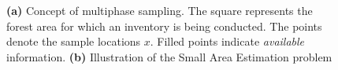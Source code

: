 \documentclass[article]{jss}
\begin{document}
\begin{figure}[htb]
	\begin{subfigure}[t]{0.5\textwidth} 
		\centering
		\caption{} \label{fig:concmphase_and_sae_a}
		\end{subfigure}
	\begin{subfigure}[t]{0.5\textwidth} 
		\centering
		\caption{} \label{fig:concmphase_and_sae_b}
	\end{subfigure}
\caption{\textbf{(a)} Concept of multiphase sampling. The square represents the forest area for which an inventory is being conducted. The points denote the sample locations $x$. Filled points indicate \textit{available} information. \textbf{(b)} Illustration of the Small Area Estimation problem}
\label{fig:concmphase_and_sae}
\end{figure}
\end{document}
